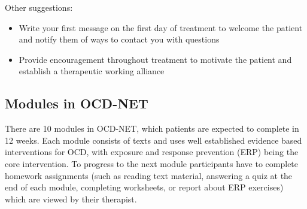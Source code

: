 \documentclass[]{book}
\providecommand{\tightlist}{%
  \setlength{\itemsep}{0pt}\setlength{\parskip}{0pt}}
\theoremstyle{definition}
\theoremstyle{definition}
\theoremstyle{definition}
\theoremstyle{remark}
\begin{document}
Other suggestions:

\begin{itemize}
\tightlist
\item
  Write your first message on the first day of treatment to welcome the
  patient and notify them of ways to contact you with questions
\item
  Provide encouragement throughout treatment to motivate the patient and
  establish a therapeutic working alliance
\end{itemize}

\hypertarget{modules-in-ocd-net}{%
\subsection{Modules in OCD-NET}\label{modules-in-ocd-net}}

There are 10 modules in OCD-NET, which patients are expected to complete
in 12 weeks. Each module consists of texts and uses well established
evidence based interventions for OCD, with exposure and response
prevention (ERP) being the core intervention. To progress to the next
module participants have to complete homework assignments (such as
reading text material, answering a quiz at the end of each module,
completing worksheets, or report about ERP exercises) which are viewed
by their therapist.
\end{document}

